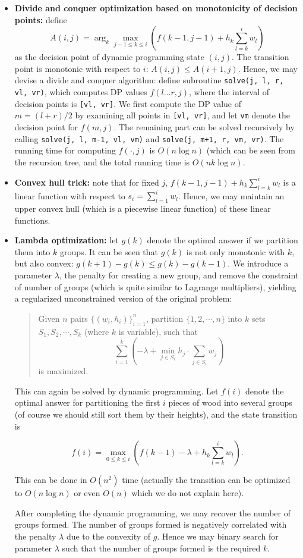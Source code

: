 \documentclass[a4paper,10.5pt,twoside]{article}
\begin{document}
\begin{itemize}
\item \textbf{Divide and conquer optimization based on monotonicity of decision points:} define 
$$A(i, j) = \arg_k\max_{j-1 \leq k \leq i} \left( f(k-1, j-1) + h_{k} \sum_{l = k}^i w_l \right)$$
as the decision point of dynamic programming state $(i, j)$. The transition point is monotonic with respect to $i$: $A(i, j) \leq A(i+1, j)$. Hence, we may devise a divide and conquer algorithm: define subroutine \verb|solve(j, l, r, vl, vr)|, which computes DP values $f(l \ldots r, j)$, where the interval of decision points is \verb|[vl, vr]|. We first compute the DP value of $m = (l+r)/2$ by examining all points in \verb|[vl, vr]|, and let \verb|vm| denote the decision point for $f(m, j)$. The remaining part can be solved recursively by calling \verb|solve(j, l, m-1, vl, vm)| and \verb|solve(j, m+1, r, vm, vr)|. The running time for computing $f(\cdot, j)$ is $O(n \log n)$ (which can be seen from the recursion tree, and the total running time is $O(nk \log n)$.
\item \textbf{Convex hull trick:} note that for fixed $j$, $f(k-1, j-1) + h_{k} \sum_{l = k}^i w_l$ is a linear function with respect to $s_i = \sum_{l = 1}^i w_l$. Hence, we may maintain an upper convex hull (which is a piecewise linear function) of these linear functions.
\item \textbf{Lambda optimization:} let $g(k)$ denote the optimal answer if we partition them into $k$ groups. It can be seen that $g(k)$ is not only monotonic with $k$, but also convex: $g(k+1) - g(k) \leq g(k) - g(k-1)$. We introduce a parameter $\lambda$, the penalty for creating a new group, and remove the constraint of number of groups (which is quite similar to Lagrange multipliers), yielding a regularized unconstrained version of the original problem:

\begin{quote}
Given $n$ pairs $\{(w_i, h_i)\}_{i=1}^n$, partition $\{1, 2, \cdots, n\}$ into $k$ sets $S_1, S_2, \cdots, S_k$ (where $k$ is variable), such that 
$$ \sum_{i=1}^k \left(-\lambda + \min_{j \in S_i} h_j \cdot \sum_{j \in S_i} w_j\right)$$
is maximized.
\end{quote}

This can again be solved by dynamic programming. Let $f(i)$ denote the optimal answer for partitioning the first $i$ pieces of wood into several groups (of course we should still sort them by their heights), and the state transition is

$$ f(i) = \max_{0 \leq k \leq i} \left(f(k-1) - \lambda  + h_{k} \sum_{l = k}^i w_l \right). $$

This can be done in $O(n^2)$ time (actually the transition can be optimized to $O(n \log n)$ or even $O(n)$ which we do not explain here).

After completing the dynamic programming, we may recover the number of groups formed. The number of groups formed is negatively correlated with the penalty $\lambda$ due to the convexity of $g$. Hence we may binary search for parameter $\lambda$ such that the number of groups formed is the required $k$.
\end{itemize}
\end{document}
